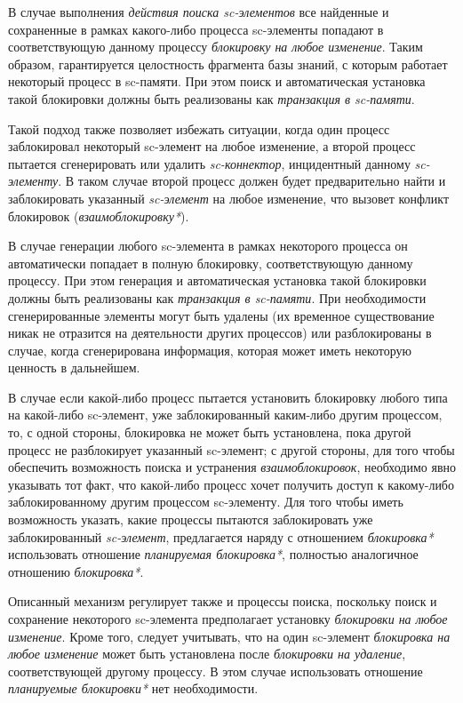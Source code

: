 В случае выполнения \textit{действия поиска sc-элементов} все найденные и сохраненные в рамках какого-либо процесса sc-элементы попадают в соответствующую данному процессу \textit{блокировку на любое изменение}. Таким образом, гарантируется целостность фрагмента базы знаний, с которым работает некоторый процесс в sc-памяти. При этом поиск и автоматическая установка такой блокировки должны быть реализованы как \textit{транзакция в sc-памяти}.
	
Такой подход также позволяет избежать ситуации, когда один процесс заблокировал некоторый sc-элемент на любое изменение, а второй процесс пытается сгенерировать или удалить \textit{sc-коннектор}, инцидентный данному \textit{sc-элементу}. В таком случае второй процесс должен будет предварительно найти и заблокировать указанный \textit{sc-элемент} на любое изменение, что вызовет конфликт блокировок (\textit{взаимоблокировку*}).

В случае генерации любого sc-элемента в рамках некоторого процесса он автоматически попадает в полную блокировку, соответствующую данному процессу. При этом генерация и автоматическая установка такой блокировки должны быть реализованы как \textit{транзакция в sc-памяти}. При необходимости сгенерированные элементы могут быть удалены (их временное существование никак не отразится на деятельности других процессов) или разблокированы в случае, когда сгенерирована информация, которая может иметь некоторую ценность в дальнейшем.

В случае если какой-либо процесс пытается установить блокировку любого типа на какой-либо sc-элемент, уже заблокированный каким-либо другим процессом, то, с одной стороны, блокировка не может быть установлена, пока другой процесс не разблокирует указанный sc-элемент; с другой стороны, для того чтобы обеспечить возможность поиска и устранения \textit{взаимоблокировок}, необходимо явно указывать тот факт, что какой-либо процесс хочет получить доступ к какому-либо заблокированному другим процессом sc-элементу. Для того чтобы иметь возможность указать, какие процессы пытаются заблокировать уже заблокированный \textit{sc-элемент}, предлагается наряду с отношением \textit{блокировка*} использовать отношение \textit{планируемая блокировка*}, полностью аналогичное отношению \textit{блокировка*}.
	
Описанный механизм регулирует также и процессы поиска, поскольку поиск и сохранение некоторого sc-элемента предполагает установку \textit{блокировки на любое изменение}. Кроме того, следует учитывать, что на один sc-элемент \textit{блокировка на любое изменение} может быть установлена после \textit{блокировки на удаление}, соответствующей другому процессу. В этом случае использовать отношение \textit{планируемые блокировки*} нет необходимости.
	
